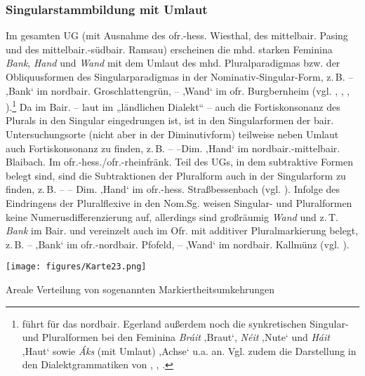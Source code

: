 \subsubsection{Singularstammbildung mit Umlaut}
\label{sec:7.1.3.2}
Im gesamten UG (mit Ausnahme des ofr.-hess. Wiesthal, des mittelbair. Pasing und des mittelbair.-südbair. Ramsau) erscheinen die mhd. starken Feminina \textit{Bank}, \textit{Hand} und \textit{Wand} mit dem Umlaut des mhd. Pluralparadigmas bzw. der Obliquusformen des Singularparadigmas in der Nominativ-Singular-Form, z.\,B.  --  ‚Bank‘ im nordbair. Groschlattengrün,  --  ‚Wand‘ im ofr. Burgbernheim (vgl. \citealt[54]{Roth1940}, \citealt[190]{Rowley1997}, \citealt[443]{Schirmunski1962}, \citealt[§803]{Schmeller1821}).\footnote{\citet[325]{Schiepek1908} führt für das nordbair. Egerland außerdem noch die synkretischen Singular- und Pluralformen bei den Feminina \textit{Bráit} ‚Braut‘, \textit{Néit} ‚Nute‘ und \textit{Háit} ‚Haut‘ sowie \textit{Áks} (mit Umlaut) ‚Achse‘ u.a. an. Vgl. zudem die Darstellung in den Dialektgrammatiken von \citet[31]{Förster1912/13}, \citet[86]{Kemmeter1924}, \citet[285--284]{Schübel1955}.}  Da im Bair. -- laut \citet[331]{Zehetner1983} im „ländlichen Dialekt“ -- auch die Fortiskonsonanz des Plurals in den Singular eingedrungen ist, ist in den Singularformen der bair. Untersuchungsorte (nicht aber in der Diminutivform) teilweise neben Umlaut auch Fortiskonsonanz zu finden, z.\,B.  --  --Dim.  ‚Hand‘ im nordbair.-mittelbair. Blaibach. Im ofr.-hess./ofr.-rheinfränk. Teil des UGs, in dem subtraktive Formen belegt sind, sind die Subtraktionen der Pluralform auch in der Singularform zu finden, z.\,B.  --   -- Dim.  ‚Hand‘ im ofr.-hess. Straßbessenbach (vgl. \citealt[12]{Hirsch1958}). Infolge des Eindringens der Pluralflexive in den Nom.Sg. weisen Singular- und Pluralformen keine Numerusdifferenzierung auf, allerdings sind großräumig \textit{Wand} und z.\,T. \textit{Bank} im Bair. und vereinzelt auch im Ofr. mit additiver Pluralmarkierung belegt, z.\,B.  --  ‚Bank‘ im ofr.-nordbair. Pfofeld,  --  ‚Wand‘ im nordbair. Kallmünz (vgl. ).


\begin{map}
\texttt{[image: figures/Karte23.png]}
\caption{Areale Verteilung von sogenannten Markiertheitsumkehrungen}
\label{map:23}
\end{map}

